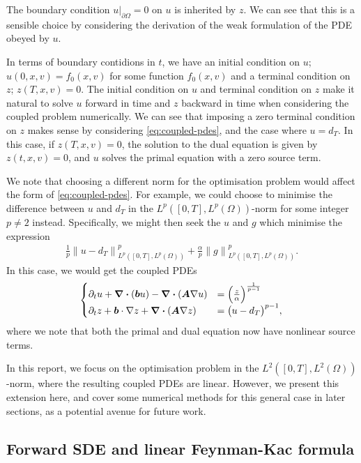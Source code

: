 The boundary condition ${u \rvert}_{\partial \Omega} = 0$ on $u$ is inherited by $z$. We can see that this is a sensible choice by considering the derivation of the weak formulation of the PDE obeyed by $u$.

In terms of boundary contidions in $t$, we have an initial condition on $u$; $u(0,x,v)=f_0(x,v)$ for some function $f_0(x,v)$ and a terminal condition on $z$; $z(T,x,v)=0$. The initial condition on $u$ and terminal condition on $z$ make it natural to solve $u$ forward in time and $z$ backward in time when considering the coupled problem numerically. We can see that imposing a zero terminal condition on $z$ makes sense by considering \autoref{eq:coupled-pdes}, and the case where $u=d_T$. In this case, if $z(T,x,v)=0$, the solution to the dual equation is given by $z(t,x,v)=0$, and $u$ solves the primal equation with a zero source term. 

We note that choosing a different norm for the optimisation problem would affect the form of \autoref{eq:coupled-pdes}. For example, we could choose to minimise the difference between $u$ and $d_T$ in the $L^p([0,T],L^p(\Omega))$-norm for some integer $p\neq 2$ instead. Specifically, we might then seek the $u$ and $g$ which minimise the expression 
%
\begin{align} 
    \frac{1}{p} {\lVert u - d_T \rVert}^p_{L^p([0,T],L^p(\Omega))} + \frac{\alpha}{p} {\lVert g \rVert}^p_{L^p([0,T],L^p(\Omega))}.
\end{align}
%
In this case, we would get the coupled PDEs 
%
\begin{align} 
    \label{eq:nonlinear-pde-system}
    \begin{cases} 
        \partial_t u + \div{(\boldsymbol{b}u)} - \div{(\boldsymbol{A} \nabla u)} &= {\Big(\frac{z}{\alpha} \Big)}^{\frac{1}{p-1}} \\
        \partial_t z + \boldsymbol{b} \cdot \nabla z + \div{(\boldsymbol{A} \nabla z)} &= {\big(u - d_T\big)}^{p-1},
    \end{cases}
\end{align}
%
where we note that both the primal and dual equation now have nonlinear source terms. 

In this report, we focus on the optimisation problem in the $L^2([0,T],L^2(\Omega))$-norm, where the resulting coupled PDEs are linear. However, we present this extension here, and cover some numerical methods for this general case in later sections, as a potential avenue for future work.

\subsection{Forward SDE and linear Feynman-Kac formula}


